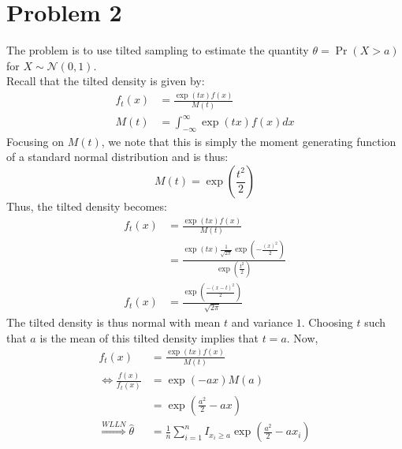 \documentclass[12pt]{article}
\newcommand{\LRA}{\Leftrightarrow}
\newcommand{\RA}{\Rightarrow}
\begin{document}
	
		\begin{center}
		\end{center}
	
	
	
\section*{Problem 2}
	The problem is to use tilted sampling to estimate the quantity $ \theta = \Pr(X>a) $ for $ X\sim \mathcal{N}(0,1) $. \\
	Recall that the tilted density is given by:
	\begin{align*}
		f_t(x) &= \frac{\exp(tx)f(x)}{M(t)} \\
		M(t) &= \int_{-\infty}^{\infty} \exp(tx)f(x) d x
	\end{align*}
	Focusing on $ M(t) $, we note that this is simply the moment generating function of a standard normal distribution and is thus:
	\[ M(t) = \exp\left(\frac{t^2}{2}\right) \]
	Thus, the tilted density becomes:
	\begin{align*}
		f_t(x) &= \frac{\exp(tx)f(x)}{M(t)} \\
		&= \frac{\exp(tx)\frac{1}{\sqrt{2 \pi }} \exp\left(-\frac{(x)^{2}}{2 }\right)}{\exp\left(\frac{t^2}{2}\right)}\\
		f_t(x) &= \frac{\exp\left( \frac{-(x-t)^2}{2} \right)}{\sqrt{2 \pi }}
	\end{align*}
	The tilted density is thus normal with mean $ t $ and variance $ 1 $. Choosing $ t $ such that $ a $ is the mean of this tilted density implies that $ t = a $. Now,
	\begin{align*}
		f_t(x) &= \frac{\exp(tx)f(x)}{M(t)} \\
		\LRA \frac{f(x)}{f_t(x)} &= \exp(-ax)M(a) \\
		& = \exp\left(\frac{a^2}{2}-ax\right)\\
		\overset{WLLN}{\RA} \hat{\theta} &= \frac{1}{n}\sum\limits_{i=1}^n I_{x_i\geq a} \exp\left(\frac{a^2}{2}-ax_i\right)
	\end{align*}
		\begin{center}
		\end{center}
	
\end{document}
